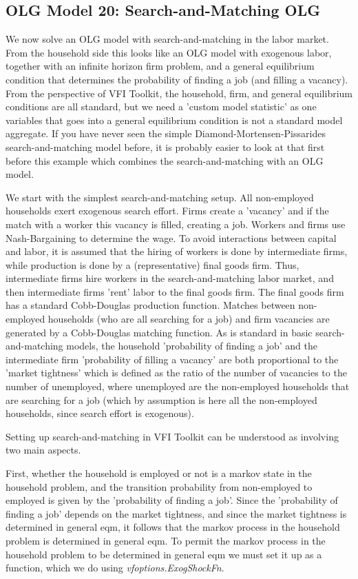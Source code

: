 \subsection{OLG Model 20: Search-and-Matching OLG}
We now solve an OLG model with search-and-matching in the labor market. From the household side this looks like an OLG model with exogenous labor, together with an infinite horizon firm problem, and a general equilibrium condition that determines the probability of finding a job (and filling a vacancy). From the perspective of VFI Toolkit, the household, firm, and general equilibrium conditions are all standard, but we need a 'custom model statistic' as one variables that goes into a general equilibrium condition is not a standard model aggregate. If you have never seen the simple Diamond-Mortensen-Pissarides search-and-matching model before, it is probably easier to look at that first before this example which combines the search-and-matching with an OLG model.

We start with the simplest search-and-matching setup. All non-employed households exert exogenous search effort. Firms create a 'vacancy' and if the match with a worker this vacancy is filled, creating a job. Workers and firms use Nash-Bargaining to determine the wage. To avoid interactions between capital and labor, it is assumed that the hiring of workers is done by intermediate firms, while production is done by a (representative) final goods firm. Thus, intermediate firms hire workers in the search-and-matching labor market, and then intermediate firms 'rent' labor to the final goods firm. The final goods firm has a standard Cobb-Douglas production function. Matches between non-employed households (who are all searching for a job) and firm vacancies are generated by a Cobb-Douglas matching function. As is standard in basic search-and-matching models, the household 'probability of finding a job' and the intermediate firm 'probability of filling a vacancy' are both proportional to the 'market tightness' which is defined as the ratio of the number of vacancies to the number of unemployed, where unemployed are the non-employed households that are searching for a job (which by assumption is here all the non-employed households, since search effort is exogenous).

Setting up search-and-matching in VFI Toolkit can be understood as involving two main aspects.

First, whether the household is employed or not is a markov state in the household problem, and the transition probability from non-employed to employed is given by the 'probability of finding a job'. Since the 'probability of finding a job' depends on the market tightness, and since the market tightness is determined in general eqm, it follows that the markov process in the household problem is determined in general eqm. To permit the markov process in the household problem to be determined in general eqm we must set it up as a function, which we do using \textit{vfoptions.ExogShockFn}.

